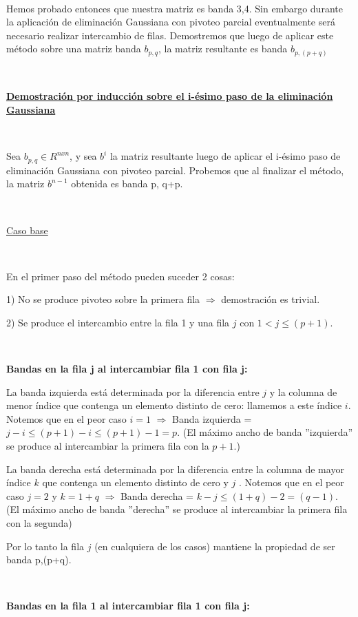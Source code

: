 ~

Hemos probado entonces que nuestra matriz es banda 3,4. Sin embargo durante la aplicación 
de eliminación Gaussiana con pivoteo parcial eventualmente será necesario realizar intercambio de filas. 
Demostremos que luego de aplicar este método sobre una matriz banda $b_{p,q}$, la matriz resultante es banda $b_{p,(p+q)}$

~

\underline{\textbf{Demostración por inducción sobre el i-ésimo paso de la eliminación Gaussiana}}

~

Sea $b_{p,q} \in R^{nxn}$, y sea $b^{i}$ la matriz resultante luego de aplicar el i-ésimo paso de eliminación Gaussiana con
pivoteo parcial. Probemos que al finalizar el método, la matriz $b^{n-1}$ obtenida es banda p, q+p.

~

\underline{Caso base}

~

En el primer paso del método pueden suceder 2 cosas:

1) No se produce pivoteo sobre la primera fila $\Rightarrow$ demostración es trivial.

2) Se produce el intercambio entre la fila 1 y una fila $j$ con $1<j \leq (p+1)$. 

~

\textbf{Bandas en la fila j al intercambiar fila 1 con fila j:}

La banda izquierda está determinada por la diferencia entre $j$ y la columna de menor índice que contenga un elemento distinto
de cero: llamemos a este índice $i$. Notemos que en el peor caso $i=1$ $\Rightarrow$ Banda izquierda = $j-i \leq (p+1) - i \leq
(p+1) - 1 = p$. (El máximo ancho de banda ''izquierda'' se produce al intercambiar la primera fila con la $p+1$.)

La banda derecha está determinada por la diferencia entre la columna de mayor índice $k$
que contenga un elemento distinto de cero y $j$ . Notemos que en el peor caso $j=2$ y $k =1+q$ $\Rightarrow$ Banda derecha =
$k-j \leq (1+q) -2 = (q-1)$. (El máximo ancho de banda ''derecha'' se produce al intercambiar la primera fila
con la segunda)

Por lo tanto la fila $j$ (en cualquiera de los casos) mantiene la propiedad de ser banda p,(p+q).

~

\textbf{Bandas en la fila 1 al intercambiar fila 1 con fila j:}

